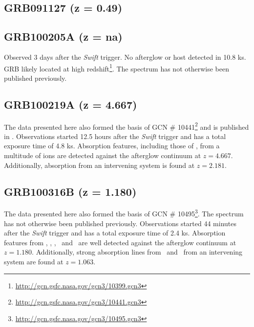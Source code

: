 \documentclass{aa}    %
\begin{document}
\subsection{GRB091127 (z = 0.49)}


\subsection{GRB100205A  (z = na)}
Observed 3 days after the \textit{Swift} trigger. No afterglow or host detected
in 10.8 ks. GRB likely located at high
redshift\footnote{\url{http://gcn.gsfc.nasa.gov/gcn3/10399.gcn3}}. The spectrum
has not otherwise been published previously.

\subsection{GRB100219A (z = 4.667)}
The data presented here also formed the basis of GCN \#
10441\footnote{\url{http://gcn.gsfc.nasa.gov/gcn3/10441.gcn3}} and is published
in \citet{Thone2013}. Observations started 12.5 hours after the \textit{Swift}
trigger and has a total exposure time of 4.8 ks. Absorption features, including
those of \lya, from a multitude of ions are detected against the afterglow
continuum at $z = 4.667$. Additionally, absorption from an intervening system
is found at $z = 2.181$.

\subsection{GRB100316B (z = 1.180)}
The data presented here also formed the basis of GCN \#
10495\footnote{\url{http://gcn.gsfc.nasa.gov/gcn3/10495.gcn3}}. The spectrum
has not otherwise been published previously. Observations started 44 minutes
after the \textit{Swift} trigger and has a total exposure time of 2.4 ks.
Absorption features from \feii, \alii, \aliii,	\mgii~and \mgi~are well detected
against the afterglow continuum at $z = 1.180$. Additionally, strong absorption
lines from \feii~and \mgii~from an intervening system are found at $z = 1.063$.
\end{document}
